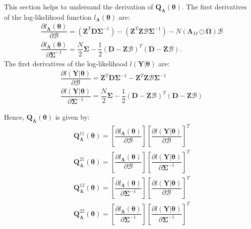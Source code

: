 This section helps to undersand the derivation of $\bm{Q}_{\bm{\Lambda}}(\bm{\theta})$. The first derivatives of the log-likelihood function $l_{\bm{\Lambda}}(\bm{\theta})$ are:
\begin{align}
& \dfrac{\partial l_{\bm{\Lambda}}(\bm{\theta})}{\partial \bm{\mathcal{B}}} = \left(\bm{Z}^T \bm{D} \bm{\Sigma}^{-1} \right) - \left(\bm{Z}^T\bm{Z} \bm{\mathcal{B}}\bm{\Sigma}^{-1} \right) - N \left(\bm{\Lambda}_M \odot \bm{\Omega} \right) \bm{\mathcal{B}} \nonumber \\
& \dfrac{\partial l_{\bm{\Lambda}}(\bm{\theta})}{\partial \bm{\Sigma}^{-1}} = \dfrac{N}{2}\bm{\Sigma}-\dfrac{1}{2}\left(\bm{D} - \bm{Z} \bm{\mathcal{B}}\right)^T \left(\bm{D} - \bm{Z} \bm{\mathcal{B}}\right). \nonumber
\end{align}
The first derivatives of the log-likelihood $l(\bm{Y}|\bm{\theta})$ are:
\begin{align}
& \dfrac{\partial l(\bm{Y}|\bm{\theta})}{\partial \bm{\mathcal{B}}} = \bm{Z}^T\bm{D}\bm{\Sigma}^{-1} - \bm{Z}^T\bm{Z}\bm{\mathcal{B}}\bm{\Sigma}^{-1} \nonumber \\
& \dfrac{\partial l(\bm{Y}|\bm{\theta})}{\partial \bm{\Sigma}^{-1}} = \dfrac{N}{2}\bm{\Sigma}-\dfrac{1}{2}\left(\bm{D} - \bm{Z} \bm{\mathcal{B}}\right)^T \left(\bm{D} - \bm{Z} \bm{\mathcal{B}}\right) \nonumber
\end{align}

Hence, $\bm{Q}_{\bm{\Lambda}}(\bm{\theta})$ is given by:
\begin{align}
& \bm{Q}^{11}_{\bm{\Lambda}}(\bm{\theta}) = \left[\dfrac{\partial l_{\bm{\Lambda}}(\bm{\theta})}{\partial \bm{\mathcal{B}}}\right]\left[\dfrac{\partial l(\bm{Y}|\bm{\theta})}{\partial \bm{\mathcal{B}}}\right]^T \nonumber \\
& \bm{Q}^{21}_{\bm{\Lambda}}(\bm{\theta}) = \left[\dfrac{\partial l_{\bm{\Lambda}}(\bm{\theta})}{\partial \bm{\mathcal{B}}}\right]\left[\dfrac{\partial l(\bm{Y}|\bm{\theta})}{\partial \bm{\Sigma}^{-1}}\right]^T \nonumber \\
& \bm{Q}^{12}_{\bm{\Lambda}}(\bm{\theta}) = \left[\dfrac{\partial l_{\bm{\Lambda}}(\bm{\theta})}{\partial \bm{\Sigma}^{-1}}\right]\left[\dfrac{\partial l(\bm{Y}|\bm{\theta})}{\partial \bm{\mathcal{B}}}\right]^T \nonumber \\
& \bm{Q}^{22}_{\bm{\Lambda}}(\bm{\theta}) = \left[\dfrac{\partial l_{\bm{\Lambda}}(\bm{\theta})}{\partial \bm{\Sigma}^{-1}}\right]\left[\dfrac{\partial l(\bm{Y}|\bm{\theta})}{\partial \bm{\Sigma}^{-1}}\right]^T \nonumber
\end{align}